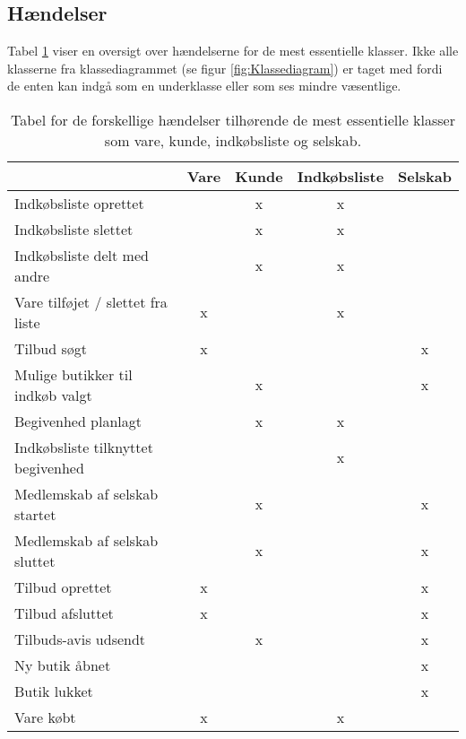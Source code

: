 \subsection{Hændelser}

Tabel \ref{tab:haendelsestabel} viser en oversigt over hændelserne for de mest essentielle klasser. Ikke alle klasserne fra klassediagrammet (se figur \ref{fig:Klassediagram}) er taget med fordi de enten kan indgå som en underklasse eller som ses mindre væsentlige.

\begin{table}[H]
\centering
    \begin{tabular}{|l|c|c|c|c|}
\hline
        ~                                  & Vare & Kunde & Indkøbsliste & Selskab \\ \hline
        Indkøbsliste oprettet              & ~    & x     & x            & ~       \\ \hline 
        Indkøbsliste slettet               & ~    & x     & x            & ~       \\ \hline
        Indkøbsliste delt med andre        & ~    & x     & x            & ~       \\ \hline
        Vare tilføjet / slettet fra liste  & x    & ~     & x            & ~       \\ \hline
        Tilbud søgt                        & x    & ~     & ~            & x       \\ \hline
        Mulige butikker til indkøb valgt   &  ~   & x     & ~            & x       \\ \hline
        Begivenhed planlagt                & ~    & x     & x            & ~       \\ \hline
        Indkøbsliste tilknyttet begivenhed & ~    & ~     & x            & ~       \\ \hline
        Medlemskab af selskab startet      & ~    & x     & ~            & x       \\ \hline
        Medlemskab af selskab sluttet      & ~    & x     & ~            & x       \\ \hline
        Tilbud oprettet                    & x    & ~     & ~            & x       \\ \hline
        Tilbud afsluttet                   & x    & ~     & ~            & x       \\ \hline 
        Tilbuds-avis udsendt               & ~    & x     & ~            & x       \\ \hline
        Ny butik åbnet                     & ~    & ~     & ~            & x       \\ \hline
        Butik lukket                       & ~    & ~     & ~            & x       \\ \hline
        Vare købt                          & x    & ~     & x            & ~       \\
\hline
    \end{tabular}

\caption{Tabel for de forskellige hændelser tilhørende de mest essentielle klasser som vare, kunde, indkøbsliste og selskab.}
\label{tab:haendelsestabel}
\end{table}